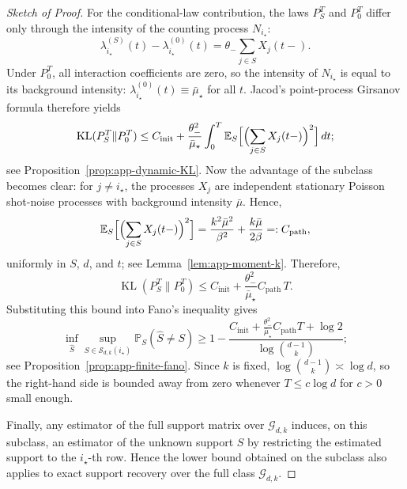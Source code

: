 \documentclass{article}
\newcommand{\KL}{\operatorname{KL}}
\newcommand{\thetalo}{\theta_-}
\newcommand{\Pbb}{\mathbb{P}}
\newcommand{\E}{\mathbb{E}}
\begin{document}
\begin{proof}[Sketch of Proof]
For the conditional-law contribution, the laws $P_S^T$ and $P_0^T$ differ only through the intensity of the counting process $N_{i_\star}$:
\[
\lambda_{i_\star}^{(S)}(t)-\lambda_{i_\star}^{(0)}(t)
=
\thetalo\sum_{j\in S} X_j(t-).
\]
Under $P_0^T$, all interaction coefficients are zero, so the intensity of $N_{i_\star}$ is equal to its background intensity:  $\lambda_{i_\star}^{(0)}(t)\equiv \bar\mu_\star$ for all $t$.
Jacod's point-process Girsanov formula \cite{jacod1975multivariate} therefore yields
\[
\KL(P_S^T\|P_0^T)
\le
C_{\mathrm{init}}
+
\frac{\thetalo^2}{\bar\mu_\star}
\int_0^T
\E_S\Bigl[\Bigl(\sum_{j\in S}X_j(t-)\Bigr)^2\Bigr]\,dt;
\]
see Proposition~\ref{prop:app-dynamic-KL}. Now the advantage of the subclass becomes clear: for $j\neq i_\star$, the processes $X_j$ are independent stationary Poisson shot-noise processes with background intensity $\bar\mu$. Hence,
\[
\E_S\Bigl[\Bigl(\sum_{j\in S}X_j(t-)\Bigr)^2\Bigr]
=
\frac{k^2\bar\mu^2}{\beta^2}
+
\frac{k\bar\mu}{2\beta}
=: C_{\mathrm{path}},
\]
uniformly in $S$, $d$, and $t$; see Lemma~\ref{lem:app-moment-k}. Therefore,
\[
\KL(P_S^T\|P_0^T)
\le
C_{\mathrm{init}}
+
\frac{\thetalo^2}{\bar\mu_\star} C_{\mathrm{path}}\,T.
\]
Substituting this bound into Fano's inequality gives
\begin{equation}
\label{eq:fano-thm}
\inf_{\widehat S}
\sup_{S\in\mathcal S_{d,k}(i_\star)}
\Pbb_S(\widehat S\neq S)
\ge
1-
\frac{
C_{\mathrm{init}}
+
\frac{\thetalo^2}{\bar\mu_\star}C_{\mathrm{path}}T
+
\log 2
}{
\log \binom{d-1}{k}
};
\end{equation}
see Proposition~\ref{prop:app-finite-fano}. Since $k$ is fixed,
$\log\binom{d-1}{k}\asymp\log d$, so the right-hand side is bounded away from zero whenever $T\le c\log d$ for $c>0$ small enough.

Finally, any estimator of the full support matrix over $\mathcal G_{d,k}$ induces, on this subclass, an estimator of the unknown support $S$ by restricting the estimated support to the $i_\star$-th row. Hence the lower bound obtained on the subclass also applies to exact support recovery over the full class $\mathcal G_{d,k}$. 
\end{proof}
\end{document}
